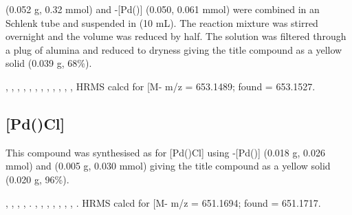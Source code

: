 
 (0.052 g, 0.32 mmol) and \trans-[Pd(\tButhixantphos)] (0.050, 0.061 mmol) were combined in an Schlenk tube and suspended in  (10 mL).  The reaction mixture was stirred overnight and the volume was reduced by half.  The solution was filtered through a plug of alumina and reduced to dryness giving the title compound as a yellow solid (0.039 g, 68\%).  

,
,
,
,
,
,
,
,
,
,
,
,
HRMS calcd for  [M-\ce{PF6]+} m/z = 653.1489; found = 653.1527.


\subsection*{[Pd(\tBusixantphosk)Cl]}


This compound was synthesised as for [Pd(\tButhixantphosk)Cl] using \trans{}-[Pd(\tBusixantphos)] (0.018 g, 0.026 mmol) and  (0.005 g, 0.030 mmol) giving the title compound as a yellow solid (0.020 g, 96\%).

,
,
,
,
.
,
,
,
,
,
,
,
.
HRMS calcd for  [M-\ce{PF6]+} m/z = 651.1694; found = 651.1717.

